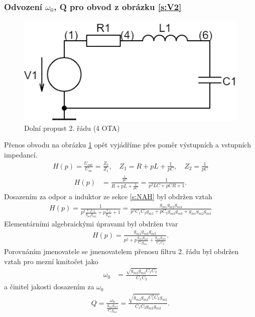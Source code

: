 \subsubsection{Odvození $\omega_0$, Q pro obvod z obrázku \ref{s:V2}}
\begin{figure}[h]
\centering
\includegraphics[scale=0.3]{Circuit(2).png}
\caption{Dolní propust 2. řádu (4 OTA) \label{s:RLC2}} 
\end{figure}
\noindent Přenos obvodu na obrázku \ref{s:RLC2} opět vyjádříme přes poměr výstupních a vstupních impedancí. 
\begin{align}
H(p) = \frac{U_{out}}{U_{in}} = \frac{Z_2}{Z_1}, \quad Z_1 = R + pL + \frac{1}{pC},\quad Z_2 = \frac{1}{pC}
\end{align}
\begin{align}
H(p) &= \frac{\frac{1}{pC}}{R + pL + \frac{1}{pC}} = \frac{1}{p^2LC + pCR + 1}.
\end{align}
\noindent Dosazením za odpor a induktor ze sekce \ref{s:NAH} byl obdržen vztah
\begin{align}
H(p) = \frac{1}{p^2\frac{C_1C_2}{g_{m3}g_{m2}} + p\frac{C_2}{g_{m1}} + 1} = \frac{g_{m1}g_{m2}g_{m3}}{p^2C_1C_2g_{m1} + pC_2g_{m2}g_{m3} + g_{m1}g_{m2}g_{m3}}
\end{align}
\noindent Elementárními algebraickými úpravami byl obdržen tvar
\begin{align}
H(p) = \frac{g_{m1}g_{m2}g_{m3}}{p^2 + p\frac{g_{m2}g_{m3}}{C_1g_{m1}} + \frac{g_{m2}g_{m3}}{C_1C_2}}.
\end{align}
Porovnáním jmenovatele se jmenovatelem přenosu filtru 2. řádu byl obdržen vztah pro mezní kmitočet jako 
\begin{align}
\omega _0 &= \frac{\sqrt{g_{m2}g_{m3}C_1C_2}}{C_1C_2}
\end{align}
a činitel jakosti dosazením za $\omega _0$
\begin{align}
Q = \frac{\omega _0}{\frac{g_{m2}g_{m3}}{C_1g_{m1}}} = \frac{\sqrt{g_{m2}g_{m3}C_1^3C_2}g_{m1}}{C_1C_2g_{m2}g_{m3}}.
\end{align}